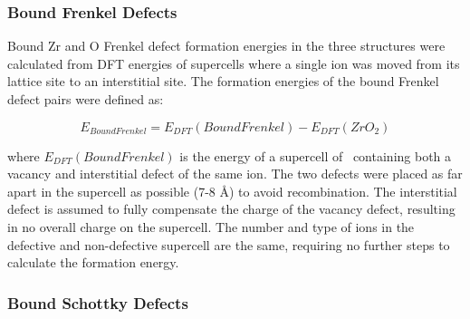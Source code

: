 \subsubsection*{Bound Frenkel Defects}

Bound Zr and O Frenkel defect formation energies in the three structures were calculated from DFT energies of supercells where a single ion was moved from its lattice site to an interstitial site. The formation energies of the bound Frenkel defect pairs were defined as:

\begin{equation}
\label{equation_frenkel_bound}
E_{BoundFrenkel} = E_{DFT}(BoundFrenkel) - E_{DFT}(ZrO_2)%
\end{equation}

where $E_{DFT}(BoundFrenkel)$ is the energy of a supercell of \zirconia\ containing both a vacancy and interstitial defect of the same ion. The two defects were placed as far apart in the supercell as possible (7-8 \r{A}) to avoid recombination. The interstitial defect is assumed to fully compensate the charge of the vacancy defect, resulting in no overall charge on the supercell. The number and type of ions in the defective and non-defective supercell are the same, requiring no further steps to calculate the formation energy.

\subsubsection*{Bound Schottky Defects}


